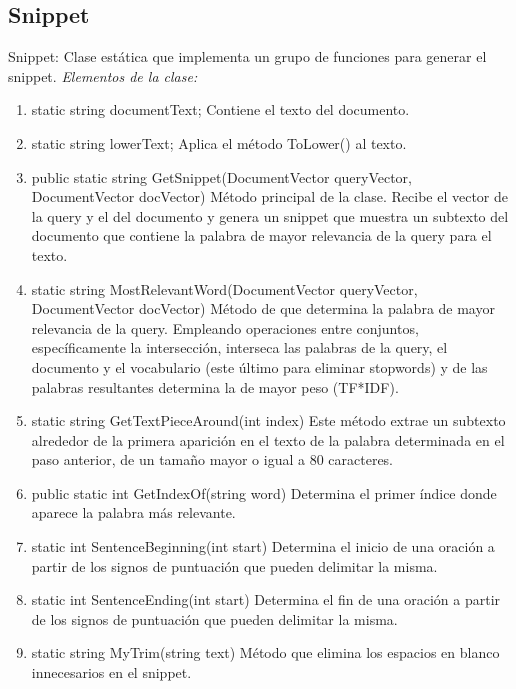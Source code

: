 \documentclass[a4paper,12pt]{article}
\begin{document}
\subsection{Snippet}
Snippet: Clase estática que implementa un grupo de funciones para generar el
snippet.
\emph{Elementos de la clase:}
\begin{enumerate}
    \item static string documentText;
    Contiene el texto del documento.
    \item static string lowerText;
    Aplica el método ToLower() al texto.
    \item public static string GetSnippet(DocumentVector queryVector,
    DocumentVector docVector){}
    Método principal de la clase. Recibe el vector de la query y el del documento y
    genera un snippet que muestra un subtexto del documento que contiene la palabra
    de mayor relevancia de la query para el texto.
    \item static string MostRelevantWord(DocumentVector queryVector,
    DocumentVector docVector)
    Método de que determina la palabra de mayor relevancia de la query. Empleando
    operaciones entre conjuntos, específicamente la intersección, interseca las palabras de la query, 
    el documento y el vocabulario (este último para eliminar
    stopwords) y de las palabras resultantes determina la de mayor peso (TF*IDF).
    \item static string GetTextPieceAround(int index)
    Este método extrae un subtexto alrededor de la primera aparición en el texto de la
    palabra determinada en el paso anterior, de un tamaño mayor o igual a 80
    caracteres.
    \item public static int GetIndexOf(string word)
    Determina el primer índice donde aparece la palabra más relevante.
    \item static int SentenceBeginning(int start)
    Determina el inicio de una oración a partir de los signos de puntuación que pueden
    delimitar la misma.
    \item static int SentenceEnding(int start)
    Determina el fin de una oración a partir de los signos de puntuación que pueden
    delimitar la misma.
    \item static string MyTrim(string text)
    Método que elimina los espacios en blanco innecesarios en el snippet.
\end{enumerate}
\end{document}
